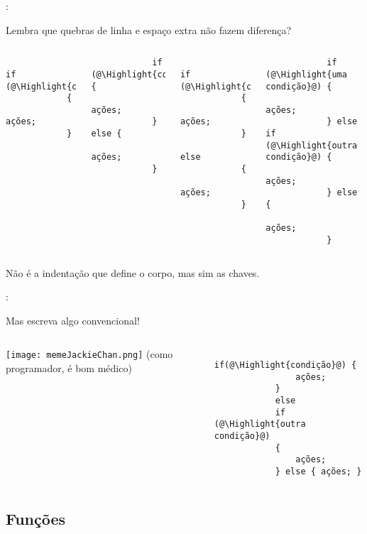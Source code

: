 \begin{frame}[fragile]{\insertsection: \insertsubsection}

	Lembra que quebras de linha e espaço extra não fazem diferença?
	\begin{columns}[t]
		\begin{verbatim}
			if (@\Highlight{condição}@)
			{
				ações;
			}
		\end{verbatim}

		\vspace{-\medskipamount}
		\begin{verbatim}
			if (@\Highlight{condição}@) {
				ações;
			} else {
				ações;
			}
		\end{verbatim}

		\begin{verbatim}
			if (@\Highlight{condição}@)
			{
				ações;
			}
			else
			{
				ações;
			}
		\end{verbatim}

		\begin{verbatim}
			if (@\Highlight{uma condição}@) {
				ações;
			} else if (@\Highlight{outra condição}@) {
				ações;
			} else {
				ações;
			}
		\end{verbatim}
	\end{columns}
	Não é a indentação que define o corpo, mas sim as chaves.

\end{frame}


\begin{frame}[fragile]{\insertsection: \insertsubsection}

	Mas escreva algo convencional!
	\begin{columns}[T]
	\centering
		\texttt{[image: memeJackieChan.png]}
		{\small (como programador, é bom médico)}

		\begin{verbatim}
			if(@\Highlight{condição}@) {
				ações;
			}
			else
			if (@\Highlight{outra condição}@)
			{
				ações;
			} else { ações; }
		\end{verbatim}
	\end{columns}

\end{frame}


\subsection{Funções}


